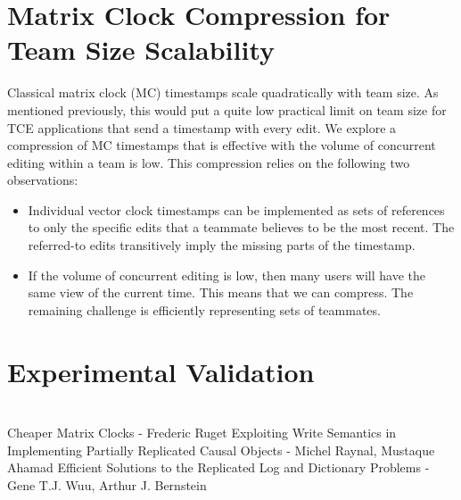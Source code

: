 \documentclass[runningheads]{llncs}
\begin{document}
\section{Matrix Clock Compression for Team Size Scalability}

Classical matrix clock (MC) timestamps scale quadratically with team size.
As mentioned previously, this would put a quite low practical limit on team size for TCE applications that send a timestamp with every edit.
We explore a compression of MC timestamps that is effective with the volume of concurrent editing within a team is low.
This compression relies on the following two observations:

\begin{itemize}
  \item Individual vector clock timestamps can be implemented as sets of references to only the specific edits that a teammate believes to be the most recent.
    The referred-to edits transitively imply the missing parts of the timestamp.
  \item If the volume of concurrent editing is low, then many users will have the same view of the current time.
    This means that we can compress.
    The remaining challenge is efficiently representing sets of teammates.
\end{itemize}

\section{Experimental Validation}

\section{}



Cheaper Matrix Clocks - Frederic Ruget
Exploiting Write Semantics in Implementing Partially Replicated Causal Objects - Michel Raynal, Mustaque Ahamad
Efficient Solutions to the Replicated Log and Dictionary Problems - Gene T.J. Wuu, Arthur J. Bernstein
\end{document}
